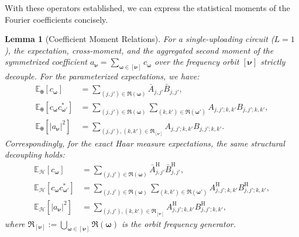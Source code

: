 \documentclass[%
 reprint,
 amsmath,amssymb,
 aps,
 pra,
]{revtex4-2}
\newtheorem{lemma}[theorem]{Lemma}
\theoremstyle{definition}
\begin{document}
With these operators established, we can express the statistical moments of the Fourier coefficients concisely.
\begin{lemma}[Coefficient Moment Relations]
\label{lemma:coefficient_moment_relations}
For a single-uploading circuit ($L=1$), the expectation, cross-moment, and the aggregated second moment of the symmetrized coefficient $a_{\bm{\nu}} = \sum_{\bm{\omega}\in[\bm{\nu}]} c_{\bm{\omega}}$ over the frequency orbit $[\bm{\nu}]$ strictly decouple. For the parameterized expectations, we have:
\begin{align}
\mathbb{E}_{\bm{\theta}} \left[ c_{\bm{\omega}} \right] &= \sum_{(j,j')\in\mathfrak R(\bm{\omega})} \bar A_{j,j'} \bar B_{j,j'}, \label{eq:coeff_first_moment_theta} \\
\mathbb{E}_{\bm{\theta}} \left[ c_{\bm{\omega}} c_{\bm{\omega}'}^* \right] &= \sum_{(j,j')\in\mathfrak R(\bm{\omega})} \sum_{(k,k')\in\mathfrak R(\bm{\omega}')} A_{j,j';k,k'} B_{j,j';k,k'}, \label{eq:coeff_cross_moment_theta} \\
\mathbb{E}_{\bm{\theta}} \left[ |a_{\bm{\nu}}|^2 \right] &= \sum_{(j,j'), (k,k') \in \mathfrak{R}_{[\bm{\nu}]}} A_{j,j';k,k'} B_{j,j';k,k'}. \label{eq:coeff_aggregated_moment_theta}
\end{align}
Correspondingly, for the exact Haar measure expectations, the same structural decoupling holds:
\begin{align}
\mathbb{E}_{\mathcal{H}} \left[ c_{\bm{\omega}} \right] &= \sum_{(j,j')\in\mathfrak R(\bm{\omega})} \bar A^{\mathrm{H}}_{j,j'} \bar B^{\mathrm{H}}_{j,j'}, \label{eq:coeff_first_moment_haar} \\
\mathbb{E}_{\mathcal{H}} \left[ c_{\bm{\omega}} c_{\bm{\omega}'}^* \right] &= \sum_{(j,j')\in\mathfrak R(\bm{\omega})} \sum_{(k,k')\in\mathfrak R(\bm{\omega}')} A^{\mathrm{H}}_{j,j';k,k'} B^{\mathrm{H}}_{j,j';k,k'}, \label{eq:coeff_cross_moment_haar} \\
\mathbb{E}_{\mathcal{H}} \left[ |a_{\bm{\nu}}|^2 \right] &= \sum_{(j,j'), (k,k') \in \mathfrak{R}_{[\bm{\nu}]}} A^{\mathrm{H}}_{j,j';k,k'} B^{\mathrm{H}}_{j,j';k,k'}, \label{eq:coeff_aggregated_moment_haar}
\end{align}
where $\mathfrak{R}_{[\bm{\nu}]} := \bigcup_{\bm{\omega}\in[\bm{\nu}]} \mathfrak{R}(\bm{\omega})$ is the orbit frequency generator.
\end{lemma}
\end{document}
